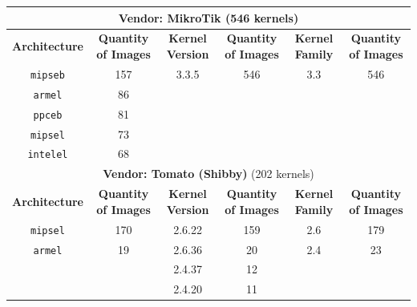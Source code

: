 \begin{table}[H]
{\begin{tabular}{|c|c|c|c|c|c|}
\multicolumn{6}{|c|}{\textbf{Vendor: MikroTik} (546 kernels)}                                                                    \\ \hline
\textbf{Architecture}  &  \multicolumn{1}{c|}{\textbf{Quantity of Images}} & \textbf{Kernel Version} & \multicolumn{1}{c|}{\textbf{Quantity of Images}} & \textbf{Kernel Family} & \textbf{Quantity of Images} \\ \hline
{\tt mipseb}            & \multicolumn{1}{c|}{157}                & 3.3.5                  & \multicolumn{1}{c|}{546}                           & 3.3                     & 546                       \\
{\tt armel}             & \multicolumn{1}{c|}{86}                 &                        & \multicolumn{1}{c|}{}                              &                         &                           \\
{\tt ppceb}             & \multicolumn{1}{c|}{81}                 &                        & \multicolumn{1}{c|}{}                              &                         &                           \\ 
{\tt mipsel}            & \multicolumn{1}{c|}{73}                 &                        & \multicolumn{1}{c|}{}                              &                         &                           \\ 
{\tt intelel}           & \multicolumn{1}{c|}{68}                 &                        & \multicolumn{1}{c|}{}                              &                         &                           \\ \hline

\multicolumn{6}{|c|}{\textbf{Vendor: Tomato (Shibby)} (202 kernels)}                                                                    \\ \hline
\textbf{Architecture} & \multicolumn{1}{c|}{\textbf{Quantity of Images}} & \textbf{Kernel Version} & \multicolumn{1}{c|}{\textbf{Quantity of Images}} & \textbf{Kernel Family} & \textbf{Quantity of Images} \\ \hline
{\tt mipsel}            & \multicolumn{1}{c|}{170}               & 2.6.22                  & \multicolumn{1}{c|}{159}                         & 2.6                     & 179                        \\
{\tt armel}             & \multicolumn{1}{c|}{19}                & 2.6.36                  & \multicolumn{1}{c|}{20}                          & 2.4                     & 23                         \\
                        & \multicolumn{1}{c|}{}                  & 2.4.37                  & \multicolumn{1}{c|}{12}                          &                         &                            \\
                        & \multicolumn{1}{c|}{}                  & 2.4.20                  & \multicolumn{1}{c|}{11}                          &                         &                            \\ \hline


\end{tabular}}
\end{table}
